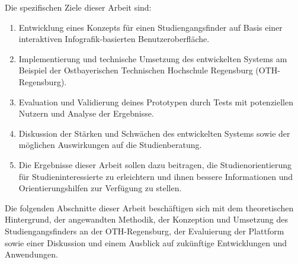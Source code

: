 Die spezifischen Ziele dieser Arbeit sind:
\begin{enumerate}
\item Entwicklung eines Konzepts für einen Studiengangsfinder auf Basis einer
interaktiven Infografik-basierten Benutzeroberfläche.
\item Implementierung und technische Umsetzung des entwickelten Systems am
Beispiel der Ostbayerischen Technischen Hochschule Regensburg (OTH-Regensburg).
\item Evaluation und Validierung deines Prototypen durch Tests mit potenziellen
Nutzern und Analyse der Ergebnisse.
\item Diskussion der Stärken und Schwächen des entwickelten Systems sowie der
möglichen Auswirkungen auf die Studienberatung.
\item Die Ergebnisse dieser Arbeit sollen dazu beitragen, die
Studienorientierung für Studieninteressierte zu erleichtern und ihnen bessere
Informationen und Orientierungshilfen zur Verfügung zu stellen.
\end{enumerate}

Die folgenden Abschnitte dieser Arbeit beschäftigen sich mit dem theoretischen
Hintergrund, der angewandten Methodik, der Konzeption und Umsetzung des
Studiengangsfinders an der OTH-Regensburg, der Evaluierung der Plattform sowie
einer Diskussion und einem Ausblick auf zukünftige Entwicklungen und
Anwendungen.